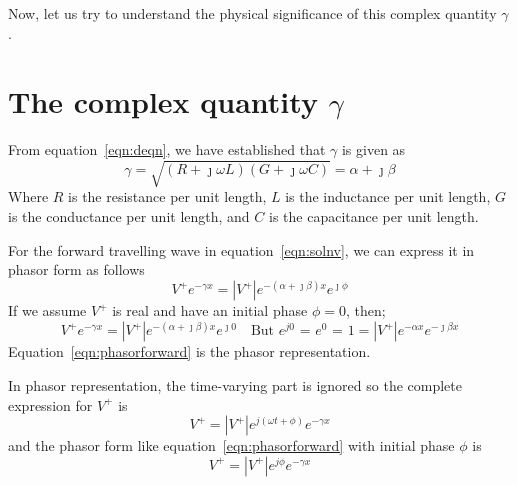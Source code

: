 Now, let us try to understand the physical significance of this complex quantity $\gamma$.

\section{The complex quantity $\gamma$}\label{lec:lec3}
From equation~\eqref{eqn:deqn}, we have established that $\gamma$ is given as
\begin{dmath}
\gamma = \sqrt{(R + \jmath\omega L)(G + \jmath\omega C)}
= \alpha + \jmath\beta
\label{eqn:gamma}
\end{dmath}
Where $R$ is the resistance per unit length, $L$ is the inductance per unit length, $G$ is the conductance per unit length, and $C$ is the capacitance per unit length.

For the forward travelling wave in equation~\eqref{eqn:solnv}, we can express it in phasor form as follows
\begin{equation}
V^+e^{-\gamma x} =\left|V^+\right|e^{-(\alpha + \jmath\beta)x}e^{\jmath\phi}
\end{equation}
If we assume $V^+$ is real and have an initial phase $\phi = 0$, then;
\begin{dmath}
V^+e^{-\gamma x} = \left| V^+\right| e^{-(\alpha + \jmath\beta)x}e^{\jmath0}\quad\text{But }e^{j0}\text{ = }e^0\text{ = }1
= \left| V^+\right| e^{-\alpha x}e^{-\jmath\beta x}
\label{eqn:phasorforward}
\end{dmath}
Equation~\eqref{eqn:phasorforward} is the phasor representation.

In phasor representation, the time-varying part is ignored so the complete expression for $V^+$ is 
\begin{equation*}
V^+ = \left|V^+\right|e^{j(\omega t + \phi)} e^{-\gamma x} 
\end{equation*}
and the phasor form like equation~\eqref{eqn:phasorforward} with initial phase $\phi$ is
\begin{equation*}
V^+ = \left|V^+\right|e^{j\phi} e^{-\gamma x}
\end{equation*}

